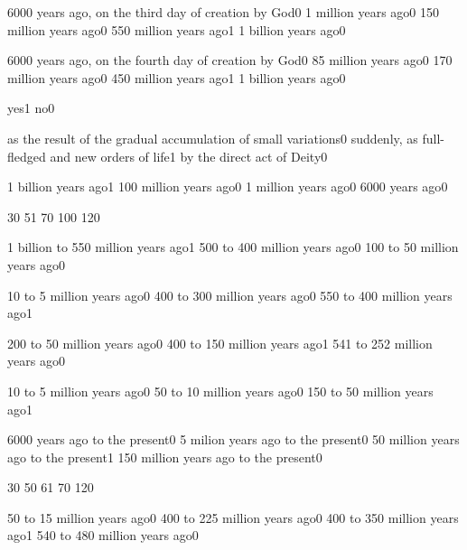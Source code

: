 {6000 years ago, on the third day of creation by God}{0}
{1 million years ago}{0}
{150 million years ago}{0}
{550 million years ago}{1}
{1 billion years ago}{0}
\qstop

{6000 years ago, on the fourth day of creation by God}{0}
{85 million years ago}{0}
{170 million years ago}{0}
{450 million years ago}{1}
{1 billion years ago}{0}
\qstop

{yes}{1}
{no}{0}
\qstop

{as the result of the gradual accumulation of small variations}{0}
{suddenly, as full\hyp{}fledged and new orders of life}{1}
{by the direct act of Deity}{0}
\qstop


{1 billion years ago}{1}
{100 million years ago}{0}
{1 million years ago}{0}
{6000 years ago}{0}
\qstop

{3}{0}
{5}{1}
{7}{0}
{10}{0}
{12}{0}
\qstop

{1 billion to 550 million years ago}{1}
{500 to 400 million years ago}{0}
{100 to 50 million years ago}{0}
\qstop

{10 to 5 million years ago}{0}
{400 to 300 million years ago}{0}
{550 to 400 million years ago}{1}
\qstop

{200 to 50 million years ago}{0}
{400 to 150 million years ago}{1}
{541 to 252 million years ago}{0}
\qstop

{10 to 5 million years ago}{0}
{50 to 10 million years ago}{0}
{150 to 50 million years ago}{1}
\qstop

{6000 years ago to the present}{0}
{5 milion years ago to the present}{0}
{50 million years ago to the present}{1}
{150 million years ago to the present}{0}
\qstop

{3}{0}
{5}{0}
{6}{1}
{7}{0}
{12}{0}
\qstop

{50 to 15 million years ago}{0}
{400 to 225 million years ago}{0}
{400 to 350 million years ago}{1}
{540 to 480 million years ago}{0}
\qstop

